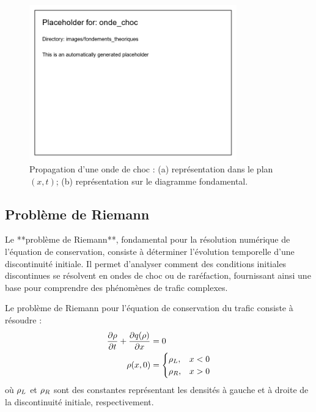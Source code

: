 \begin{figure}[htbp]
\centering
\includegraphics[width=0.8\textwidth]{images/fondements_theoriques/onde_choc}
\caption{Propagation d'une onde de choc : (a) représentation dans le plan $(x,t)$; (b) représentation sur le diagramme fondamental.}
\label{fig:onde_choc}
\end{figure}

\subsection{Problème de Riemann}
\label{subsec:riemann}

Le **problème de Riemann**, fondamental pour la résolution numérique de l'équation de conservation, consiste à déterminer l'évolution temporelle d'une discontinuité initiale. Il permet d'analyser comment des conditions initiales discontinues se résolvent en ondes de choc ou de raréfaction, fournissant ainsi une base pour comprendre des phénomènes de trafic complexes.

\begin{definition}
Le problème de Riemann pour l'équation de conservation du trafic consiste à résoudre :
\begin{align}
\frac{\partial \rho}{\partial t} + \frac{\partial q(\rho)}{\partial x} &= 0\\
\rho(x,0) &= 
\begin{cases}
\rho_L, & x < 0\\
\rho_R, & x > 0
\end{cases}
\end{align}
où $\rho_L$ et $\rho_R$ sont des constantes représentant les densités à gauche et à droite de la discontinuité initiale, respectivement.
\end{definition}

